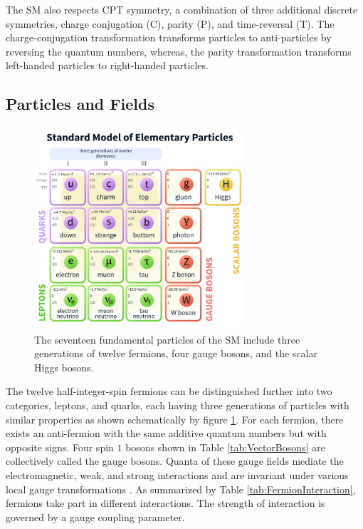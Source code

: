 The SM also respects CPT symmetry, a combination of three additional discrete symmetries, charge conjugation (C), parity (P), and time-reversal (T). The charge-conjugation transformation transforms particles to anti-particles by reversing the quantum numbers, whereas, the parity transformation transforms left-handed particles to right-handed particles.


\subsection{Particles and Fields}
\label{subsec:Constituents}

\begin{figure}[H]
	\centering
    \includegraphics[width=0.7\textwidth] {figures/SMparticles.pdf}\hspace{1cm}
    \caption{ The seventeen fundamental particles of the SM include three generations of twelve fermions, four gauge bosons, and the scalar Higgs bosons. \cite{SMFigureWiki}}
    \label{fig:SM}
\end{figure}

The twelve half-integer-spin fermions can be distinguished further into two categories, leptons, and quarks, each having three generations of particles with similar properties as shown schematically by figure \ref{fig:SM}. For each fermion, there exists an anti-fermion with the same additive quantum numbers but with opposite signs. Four spin $1$ bosons shown in Table \ref{tab:VectorBosons} are collectively called the gauge bosons. Quanta of these gauge fields mediate the electromagnetic, weak, and strong interactions and are invariant under various local gauge transformations \cite{Bernabeu2021}. As summarized by Table \ref{tab:FermionInteraction}, fermions take part in different interactions. The strength of interaction is governed by a gauge coupling parameter.

